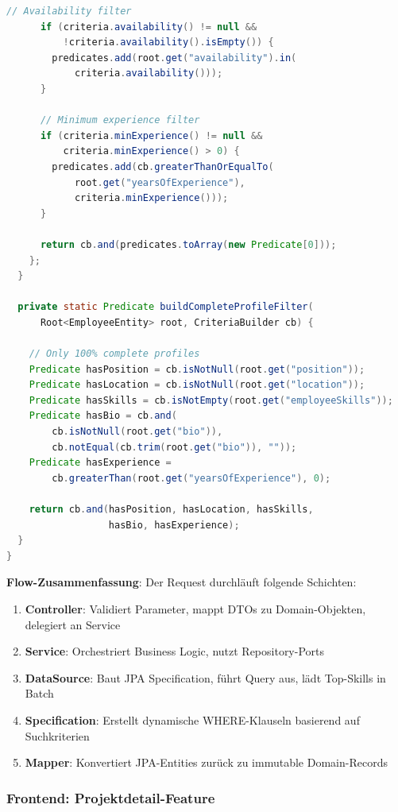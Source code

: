 \begin{lstlisting}[language=Java, caption=EmployeeSpecification - JPA Criteria API, label=lst:employee_specification]
      // Availability filter
      if (criteria.availability() != null && 
          !criteria.availability().isEmpty()) {
        predicates.add(root.get("availability").in(
            criteria.availability()));
      }

      // Minimum experience filter
      if (criteria.minExperience() != null && 
          criteria.minExperience() > 0) {
        predicates.add(cb.greaterThanOrEqualTo(
            root.get("yearsOfExperience"), 
            criteria.minExperience()));
      }

      return cb.and(predicates.toArray(new Predicate[0]));
    };
  }

  private static Predicate buildCompleteProfileFilter(
      Root<EmployeeEntity> root, CriteriaBuilder cb) {
    
    // Only 100% complete profiles
    Predicate hasPosition = cb.isNotNull(root.get("position"));
    Predicate hasLocation = cb.isNotNull(root.get("location"));
    Predicate hasSkills = cb.isNotEmpty(root.get("employeeSkills"));
    Predicate hasBio = cb.and(
        cb.isNotNull(root.get("bio")),
        cb.notEqual(cb.trim(root.get("bio")), ""));
    Predicate hasExperience = 
        cb.greaterThan(root.get("yearsOfExperience"), 0);

    return cb.and(hasPosition, hasLocation, hasSkills, 
                  hasBio, hasExperience);
  }
}
\end{lstlisting}

\textbf{Flow-Zusammenfassung}: Der Request durchläuft folgende Schichten:
\begin{enumerate}[noitemsep]
    \item \textbf{Controller}: Validiert Parameter, mappt DTOs zu Domain-Objekten, delegiert an Service
    \item \textbf{Service}: Orchestriert Business Logic, nutzt Repository-Ports
    \item \textbf{DataSource}: Baut JPA Specification, führt Query aus, lädt Top-Skills in Batch
    \item \textbf{Specification}: Erstellt dynamische WHERE-Klauseln basierend auf Suchkriterien
    \item \textbf{Mapper}: Konvertiert JPA-Entities zurück zu immutable Domain-Records
\end{enumerate}

\subsubsection{Frontend: Projektdetail-Feature}

